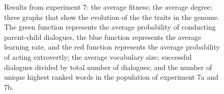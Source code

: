 \begin{figure}[b]\setcounter{subfigure}{0}
    \centering
    \hfill
    \caption[Graphs of the results from experiment 7 as a function of number of generations.]{Results from experiment 7:  the average fitness;  the average degree;  three graphs that show the evolution of the the traits in the genome. The green function represents the average probability of conducting parent-child dialogues, the blue function represents the average learning rate, and the red function represents the average probability of acting extrovertly;  the average vocabulary size;  successful dialogues divided by total number of dialogues; and  the number of unique highest ranked words in the population of experiment 7a and 7b.}
    \label{fig:exp7.0}
\end{figure}
%
